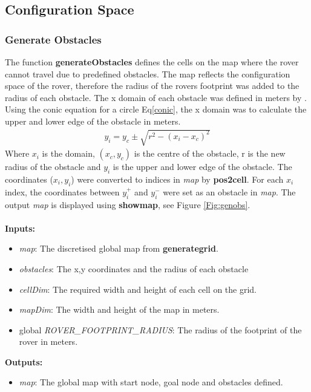 \documentclass[Space3_Assign3.tex]{subfile}
\begin{document}
\subsection{Configuration Space}
\subsubsection{Generate Obstacles} \label{Sec:genobs}
The function \textbf{generateObstacles} defines the cells on the map where the rover cannot travel due to predefined obstacles. The map reflects the configuration space of the rover, therefore the radius of the rovers footprint was added to the radius of each obstacle. The x domain of each obstacle was defined in meters \dis by . Using the conic equation for a circle Eq\eqref{conic}, the x domain was to calculate the upper and lower edge of the obstacle in meters.
\begin{eqnarray}
y_i = y_c \pm \sqrt{r^2 - (x_i -x_c)^2} \label{conic}
\end{eqnarray}
Where $x_i$ is the \dis domain, $(x_c,y_c)$ is the centre of the obstacle, r is the new radius of the obstacle and $y_i$ is the \dis upper and lower edge of the obstacle. The coordinates ($x_i,y_i$) were converted to indices in \textit{map} by \textbf{pos2cell}. For each $x_i$ index, the coordinates between $y_i^+$ and $y_i^-$ were set as an obstacle in \textit{map}. The output \textit{map} is displayed using \textbf{showmap}, see Figure \ref{Fig:genobs}.\\\\
\noindent\textbf{Inputs:}
\begin{itemize}
\item \textit{map}: The discretised global map from \textbf{generategrid}.
\item \textit{obstacles}: The x,y coordinates and the radius of each obstacle
\item \textit{cellDim}: The required width and height of each cell on the grid.
\item \textit{mapDim}: The width and height of the map in meters.
\item global \textit{ROVER\_FOOTPRINT\_RADIUS}: The radius of the footprint of the rover in meters.
\end{itemize}
\textbf{Outputs:}
\begin{itemize}
\item \textit{map}: The \dis global map with start node, goal node and obstacles defined.
\end{itemize}
\end{document}
